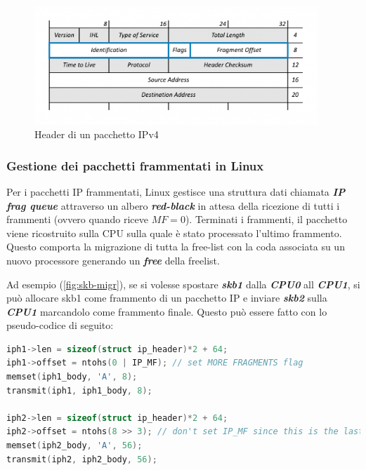 \documentclass{article}
\begin{document}
\begin{figure}[h]
  \begin{center}
    \includegraphics[width=0.95\textwidth]{figures/ch1/IPv4-Headers-Standard-Fragmentation-Highlighted-1024x431.png}
  \end{center}
  \caption{Header di un pacchetto IPv4}\label{fig:ipv4-header}
\end{figure}

\subsubsection{Gestione dei pacchetti frammentati in Linux}
Per i pacchetti IP frammentati, Linux gestisce una struttura dati chiamata \textbf{\textit{IP 
frag queue}} attraverso un albero \textbf{\textit{red-black}} in attesa della ricezione di tutti 
i frammenti (ovvero quando riceve $MF = 0$). Terminati i frammenti, il pacchetto viene 
ricostruito sulla CPU sulla quale è stato processato l'ultimo frammento. Questo comporta 
la migrazione di tutta la free-list con la coda associata su un nuovo processore 
generando un \textbf{\textit{free}} della freelist. 

Ad esempio (\cref{fig:skb-migr}), se si volesse spostare \textbf{\textit{skb1}} dalla \textbf{\textit{CPU0}} all 
\textbf{\textit{CPU1}}, si può allocare skb1 come frammento di un pacchetto IP e inviare 
\textbf{\textit{skb2}} sulla \textbf{\textit{CPU1}} marcandolo come frammento finale. 
Questo può essere fatto con lo pseudo-codice di seguito:

\begin{lstlisting}[language=C,caption="Creazione di due frammenti per un pacchetto IP"]
iph1->len = sizeof(struct ip_header)*2 + 64;
iph1->offset = ntohs(0 | IP_MF); // set MORE FRAGMENTS flag 
memset(iph1_body, 'A', 8); 
transmit(iph1, iph1_body, 8); 

iph2->len = sizeof(struct ip_header)*2 + 64; 
iph2->offset = ntohs(8 >> 3); // don't set IP_MF since this is the last packet 
memset(iph2_body, 'A', 56); 
transmit(iph2, iph2_body, 56);
\end{lstlisting}
\end{document}
